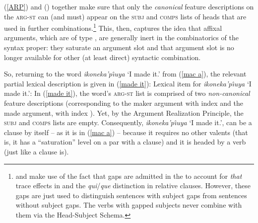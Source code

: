 \documentclass[output=paper,biblatex,babelshorthands,newtxmath,draftmode,colorlinks,citecolor=brown]{langscibook}
\begin{document}
(\ref{ARP}) and () together make sure that only the \textit{canonical} feature descriptions
on the \textsc{arg-st} can (and must) appear on the \textsc{subj} and \textsc{comps} lists of heads
that are used in further combinations.\footnote{
\citet[Section~5.1.3]{GSag2000a-u}  and \citet[]{AG2007a-u} make use of the fact that
gaps are admitted in the \subjl to account for \emph{that} trace effects in  and the \emph{qui}/\emph{que}
distinction in  relative clauses. However, these gaps are just used to distinguish
sentences with subject gaps from sentences without subject gaps. The verbs with gapped subjects
never combine with them via the Head-Subject Schema.
} %
This, then, captures the idea that affixal arguments, which are of type , are generally inert in the combinatorics of the syntax proper: they saturate an argument slot and that argument slot is no longer available for other (at least direct) syntactic combination. 

So, returning to the  word \textit{ikoneka'p\^{\i}uya} `I made it.' from (\ref{mac a}),
the relevant partial lexical description is given in (\ref{made it}):
% 
\ea
\label{made it}
Lexical item for \emph{ikoneka'p\^{\i}uya} `I made it.':
\z
%
In (\ref{made it}), the word's \textsc{arg-st} list is comprised of two \textit{non-canonical} feature descriptions (corresponding to the maker argument with index  and the made argument, with index ). Yet, by the Argument Realization Principle, the \textsc{subj} and \textsc{comps} lists are empty. Consequently, \textit{ikoneka'p\^{\i}uya} `I made it.', can be a clause by itself -- as it is in (\ref{mac a}) -- because it requires no other valents (that is, it has a ``saturation'' level on a par with a clause) and it is headed by a verb (just like a clause is). 
\end{document}
